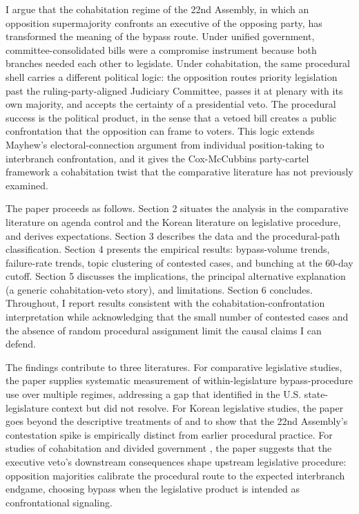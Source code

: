\documentclass[11pt]{article}
\begin{document}
I argue that the cohabitation regime of the 22nd Assembly, in which an opposition supermajority confronts an executive of the opposing party, has transformed the meaning of the bypass route. Under unified government, committee-consolidated bills were a compromise instrument because both branches needed each other to legislate. Under cohabitation, the same procedural shell carries a different political logic: the opposition routes priority legislation past the ruling-party-aligned Judiciary Committee, passes it at plenary with its own majority, and accepts the certainty of a presidential veto. The procedural success is the political product, in the sense that a vetoed bill creates a public confrontation that the opposition can frame to voters. This logic extends Mayhew's \citep{mayhew1974} electoral-connection argument from individual position-taking to interbranch confrontation, and it gives the Cox-McCubbins \citep{coxmccubbins2005} party-cartel framework a cohabitation twist that the comparative literature has not previously examined.

The paper proceeds as follows. Section 2 situates the analysis in the comparative literature on agenda control and the Korean literature on legislative procedure, and derives expectations. Section 3 describes the data and the procedural-path classification. Section 4 presents the empirical results: bypass-volume trends, failure-rate trends, topic clustering of contested cases, and bunching at the 60-day cutoff. Section 5 discusses the implications, the principal alternative explanation (a generic cohabitation-veto story), and limitations. Section 6 concludes. Throughout, I report results consistent with the cohabitation-confrontation interpretation while acknowledging that the small number of contested cases and the absence of random procedural assignment limit the causal claims I can defend.

The findings contribute to three literatures. For comparative legislative studies, the paper supplies systematic measurement of within-legislature bypass-procedure use over multiple regimes, addressing a gap that \citet{crosson2018} identified in the U.S. state-legislature context but did not resolve. For Korean legislative studies, the paper goes beyond the descriptive treatments of \citet{jang2021} and \citet{parkpy2026} to show that the 22nd Assembly's contestation spike is empirically distinct from earlier procedural practice. For studies of cohabitation and divided government \citep{mayhew1991, kriner2008, leehs2012}, the paper suggests that the executive veto's downstream consequences shape upstream legislative procedure: opposition majorities calibrate the procedural route to the expected interbranch endgame, choosing bypass when the legislative product is intended as confrontational signaling.
\end{document}
